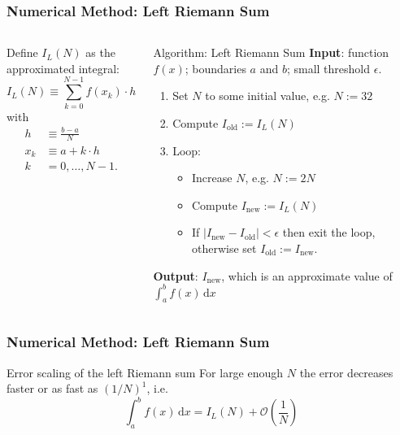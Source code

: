 \documentclass[11pt,aspectratio=169,handout]{beamer}
\begin{document}
\begin{frame}
\frametitle{Numerical Method: Left Riemann Sum}
\begin{columns}
Define $I_L(N)$ as the approximated integral:
$$I_L(N) \equiv  \sum_{k=0}^{N-1} f(x_k) \cdot h$$ 
with
\begin{align*} 
	h & \equiv \frac{b-a}{N} \\
	x_k & \equiv a + k \cdot h \\
	k & = 0, \ldots, N-1.
\end{align*}

\pause

\begin{block}{Algorithm: Left Riemann Sum}
\textbf{Input}: function $f(x)$; boundaries $a$ and $b$; small threshold $\epsilon$. \\
\pause
\begin{enumerate}
	\item Set $N$ to some initial value, e.g. $N:=32$
	\pause
	\item Compute $I_\mathrm{old} := I_L(N)$ 
	\pause
	\item Loop:
	\begin{itemize}
		\pause
		\item Increase $N$, e.g. $N := 2N$
		\pause
		\item Compute $I_\mathrm{new} := I_L(N)$
		\pause
		\item If $|I_\mathrm{new} - I_\mathrm{old}| < \epsilon$ then exit the loop, otherwise set $I_\mathrm{old} := I_\mathrm{new}$.
	\end{itemize}
\end{enumerate}
\pause
\textbf{Output}: $I_\mathrm{new}$, which is an approximate value of $\int_a^b f(x) \, \mathrm{d}x$
\end{block}
\end{columns}
\end{frame}

\begin{frame}
\frametitle{Numerical Method: Left Riemann Sum}
\begin{block}{Error scaling of the left Riemann sum}
For large enough $N$ the error decreases faster or as fast as $(1/N)^1$, i.e.
$$  \int_a^b f(x) \, \mathrm{d}x = I_L(N) + \mathcal{O}\left(\frac{1}{N}\right) $$
\end{block}
\end{frame}
\end{document}
